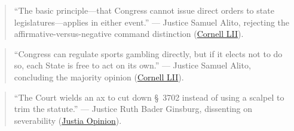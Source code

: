 \documentclass[12pt]{article}
\begin{document}
\begin{quote}
``The basic principle---that Congress cannot issue direct orders to state legislatures---applies in either event.''
--- Justice Samuel Alito, rejecting the affirmative-versus-negative command distinction (\href{https://www.law.cornell.edu/supremecourt/text/16-476}{Cornell LII}).
\end{quote}

\begin{quote}
``Congress can regulate sports gambling directly, but if it elects not to do so, each State is free to act on its own.''
--- Justice Samuel Alito, concluding the majority opinion (\href{https://www.law.cornell.edu/supremecourt/text/16-476}{Cornell LII}).
\end{quote}

\begin{quote}
``The Court wields an ax to cut down \S~3702 instead of using a scalpel to trim the statute.''
--- Justice Ruth Bader Ginsburg, dissenting on severability (\href{https://supreme.justia.com/cases/federal/us/584/16-476/}{Justia Opinion}).
\end{quote}
\end{document}
